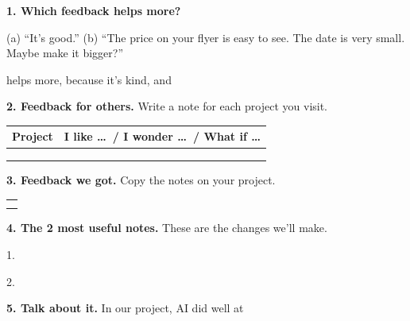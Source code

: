 \documentclass[11pt]{article}
\begin{document}
\partner


\vspace{0.4em}
{\large\textbf{1. Which feedback helps more?}}

\vspace{0.4em}
(a) ``It's good.'' \qquad (b) ``The price on your flyer is easy to see. The date is very small. Maybe make it bigger?''

\vspace{0.6em}
 helps more, because it's kind,  and 

\vspace{1.0em}
{\large\textbf{2. Feedback for others.}} Write a note for each project you visit.

\vspace{0.3em}
\begin{tabular}{|R{1.6in}|R{4.9in}|}
\hline
\textbf{Project} & \textbf{I like \dots\ / I wonder \dots\ / What if \dots} \\ \hline
{} & \\[1.5em] \hline
 & \\[1.5em] \hline
 & \\[1.5em] \hline
\end{tabular}

\vspace{1.0em}
{\large\textbf{3. Feedback we got.}} Copy the notes on your project.

\vspace{0.3em}
\begin{tabular}{|R{6.6in}|}
\hline
{} \\[1.2em] \hline
 \\[1.2em] \hline
 \\[1.2em] \hline
\end{tabular}

\vspace{1.0em}
{\large\textbf{4. The 2 most useful notes.}} These are the changes we'll make.

\vspace{0.5em}
1. 

\vspace{0.6em}
2. \blank{6.6in}

\vspace{1.0em}
{\large\textbf{5. Talk about it.}} In our project, AI did well at 
\end{document}
